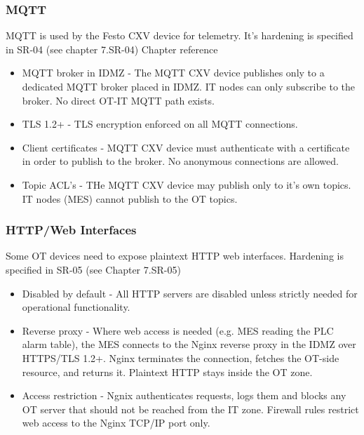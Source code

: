 \documentclass[11pt,a4paper]{article}
\begin{document}
\subsubsection{MQTT}

MQTT is used by the Festo CXV device for telemetry. It's hardening is specified
in SR-04 (see chapter 7.SR-04) Chapter reference

\begin{itemize}

    \item MQTT broker in IDMZ - The MQTT CXV device publishes only to a
        dedicated MQTT broker placed in IDMZ. IT nodes can only subscribe to
        the broker. No direct OT-IT MQTT path exists.

    \item TLS 1.2+ - TLS encryption enforced on all MQTT connections.

    \item Client certificates - MQTT CXV device must authenticate with
        a certificate in order to publish to the broker. No anonymous
        connections are allowed.

    \item Topic ACL's - THe MQTT CXV device may publish only to it's own
        topics. IT nodes (MES) cannot publish to the OT topics.

\end{itemize}

\subsubsection{HTTP/Web Interfaces}
Some OT devices need to expose plaintext HTTP web interfaces. Hardening is
specified in SR-05 (see Chapter 7.SR-05)

\begin{itemize}

    \item Disabled by default - All HTTP servers are disabled unless strictly
        needed for operational functionality.

    \item Reverse proxy - Where web access is needed (e.g. MES reading the PLC
        alarm table), the MES connects to the Nginx reverse proxy in the IDMZ
        over HTTPS/TLS 1.2+. Nginx terminates the connection, fetches the
        OT-side resource, and returns it. Plaintext HTTP stays inside the OT
        zone.

    \item Access restriction - Ngnix authenticates requests, logs them and
        blocks any OT server that should not be reached from the IT zone. Firewall
        rules restrict web access to the Nginx TCP/IP port only.

\end{itemize}
\end{document}
